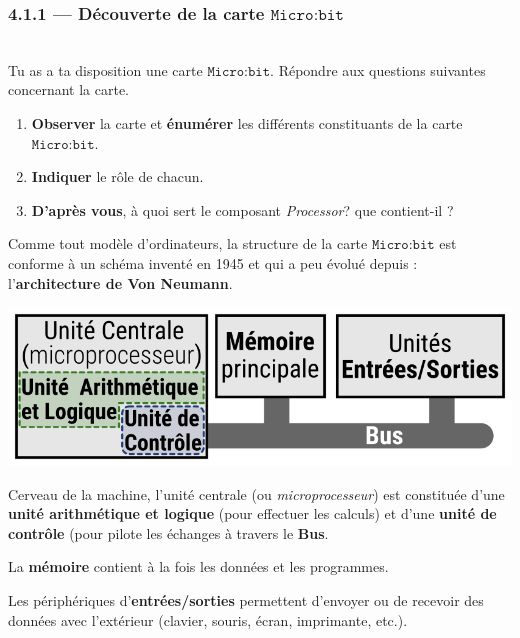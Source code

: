 \documentclass[a4paper,17pt]{extarticle}
\newenvironment{eleve}%
{\begin{activite}\color{noiramu}\\[-0.5cm]}
{\end{activite}}
\providecommand{\tightlist}{%
      \setlength{\itemsep}{0pt}\setlength{\parskip}{0pt}}
\begin{document}
    \hypertarget{duxe9couverte-de-la-carte-textttmicrobit}{%
\subsubsection{\texorpdfstring{4.1.1 --- Découverte de la carte
\(\texttt{Micro:bit}\)}{4.1.1 --- Découverte de la carte \textbackslash texttt\{Micro:bit\}}}\label{duxe9couverte-de-la-carte-textttmicrobit}}
\begin{eleve}
    Tu as a ta disposition une carte \(\texttt{Micro:bit}\). Répondre aux
questions suivantes concernant la carte.

\begin{enumerate}
\def\labelenumi{\arabic{enumi}.}
\tightlist
\item
  \textbf{Observer} la carte et \textbf{énumérer} les différents
  constituants de la carte \(\texttt{Micro:bit}\).
\item
  \textbf{Indiquer} le rôle de chacun.
\item
  \textbf{D'après vous}, à quoi sert le composant \emph{Processor}? que
  contient-il ?
\end{enumerate}
        
        \end{eleve}\begin{retenir}
    Comme tout modèle d'ordinateurs, la structure de la carte
\(\texttt{Micro:bit}\) est conforme à un schéma inventé en 1945 et qui a
peu évolué depuis : l'\textbf{architecture de Von Neumann}.

\includegraphics{./res/archi.png}

Cerveau de la machine, l'unité centrale (ou \emph{microprocesseur}) est
constituée d'une \textbf{unité arithmétique et logique} (pour effectuer
les calculs) et d'une \textbf{unité de contrôle} (pour pilote les
échanges à travers le \textbf{Bus}.

La \textbf{mémoire} contient à la fois les données et les programmes.

Les périphériques d'\textbf{entrées/sorties} permettent d'envoyer ou de
recevoir des données avec l'extérieur (clavier, souris, écran,
imprimante, etc.).

        \end{retenir}
\end{document}
